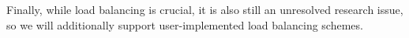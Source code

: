 \documentclass[11pt,letterpaper]{article}
\begin{document}

%
% 
Finally, while load balancing is crucial, it is also still an
unresolved research issue, so we will additionally support
user-implemented load balancing schemes.
\end{document}
